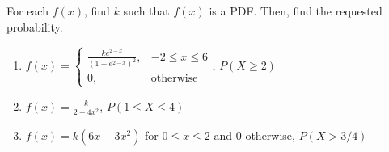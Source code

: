 \begin{Exercise}[title = {Using PDFs to Find Probabilities}, label = int_pdf]
For each $f(x)$, find $k$ such that $f(x)$ is a PDF. Then, find the requested 
probability. 
\begin{enumerate}
\item $f(x) = 
\begin{cases}
\frac{ke^{2 - x}}{\left(1 + e^{2 - x} \right)^2},&-2 \leq x \leq 6\\
0,&\text{otherwise}
\end{cases}$, $P(X \geq 2)$
\item $f(x) = \frac{k}{2 + 4x^2}$, $P(1 \leq X \leq 4)$
\item $f(x) = k(6x - 3x^2)$ for $0 \leq x \leq 2$ and 0 otherwise, $P(X > 3/4)$
\end{enumerate}
\end{Exercise}

